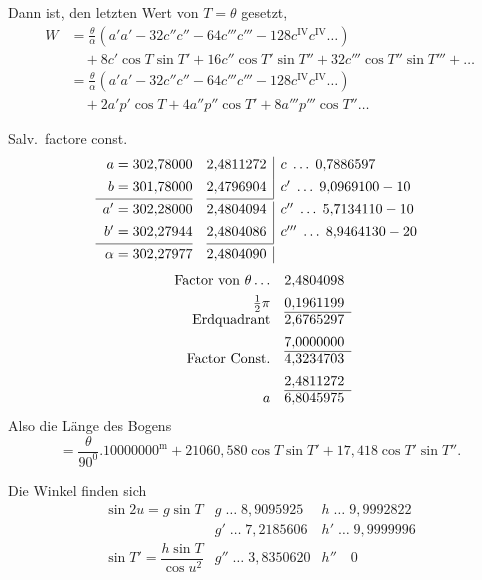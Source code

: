 \begingroup
\clearpage{}
\noindent Dann ist, den letzten Wert von \(T=\theta\) gesetzt,
{\small
\[\begin{aligned}
W&=\frac\theta\alpha(a'a'-32c''c''-64c'''c'''-128c^{\mathrm{IV}}c^{\mathrm{IV}}\ldots)\\
&\quad+8c'\cos T\sin T'+16c''\cos T'\sin T''+32c'''\cos T''\sin T'''+\ldots\\[.8em]
&=\frac\theta\alpha(a'a'-32c''c''-64c'''c'''-128c^{\mathrm{IV}}c^{\mathrm{IV}}\ldots)\\
&\quad+2a'p'\cos T+4a''p''\cos T'+8a'''p'''\cos T''\ldots
\end{aligned}\]}
\par\indent Salv.\ factore const.
{\small\setlength{\arraycolsep}{6pt}
\[\begin{array}{r@{\;=\;}r@{}c@{}r|l}
a&302{,}78000&\quad&2{,}4811272&c\;\ldots\;0{,}7886597\\[.4em]
b&301{,}78000&\quad&2{,}4796904&c'\;\ldots\;9{,}0969100-10\\[.2em]\cline{1-2}\cline{4-4}\noalign{\vskip.2em}
a'&302{,}28000&\quad&2{,}4804094&c''\;\ldots\;5{,}7134110-10\\[.4em]
b'&302{,}27944&\quad&2{,}4804086&c'''\;\ldots\;8{,}9464130-20\\[.2em]\cline{1-2}\cline{4-4}\noalign{\vskip.2em}
\alpha&302{,}27977&\quad&2{,}4804090&
\end{array}\]}
\[\begin{array}{r@{\quad}r}
\text{Factor von }\theta\ldots&2{,}4804098\\[.4em]
\frac12\pi&0{,}1961199\\\cline{2-2}
\text{Erdquadrant}&2{,}6765297\\[.4em]
&7{,}0000000\\\cline{2-2}
\text{Factor Const.}&4{,}3234703\\[.4em]
&2{,}4811272\\\cline{2-2}
a&6{,}8045975
\end{array}\]
\noindent Also die Länge des Bogens
{\small
\[=\frac\theta{90^0}.10000000^{\mathrm m}+21060{,}580\cos T\sin T'+17{,}418\cos T'\sin T''.\]}
\par\indent Die Winkel finden sich
\[\begin{array}{l|ll}
\sin2u=g\sin T&g\;\ldots\;8{,}9095925&h\;\ldots\;9{,}9992822\\[.4em]
&g'\;\ldots\;7{,}2185606&h'\;\ldots\;9{,}9999996\\[-.3em]
\sin T'=\dfrac{h\sin T}{\cos u^2}&g''\;\ldots\;3{,}8350620&h''\quad0
\end{array}\]

